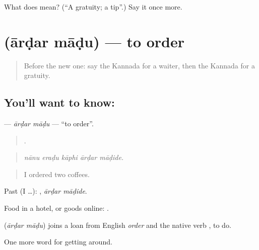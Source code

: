 \begin{tcolorbox}[breakable,colback=teal!4,colframe=teal!35!black,title={Before you move on}]
What does  mean? (\textquotedblleft{}A gratuity; a tip\textquotedblright{}.) Say it once more.
\end{tcolorbox}
\section[\texorpdfstring{\kn{ಆರ್ಡರ್} \kn{ಮಾಡು} (ārḍar māḍu)}{ಆರ್ಡರ್ ಮಾಡು (ārḍar māḍu)}]{  (ārḍar māḍu) — to order}

\label{lesson:KA-C464-ardar-madu}



\begin{quote}
Before the new one: say the Kannada for a waiter, then the Kannada for a gratuity.
\end{quote}

\subsection*{You'll want to know:  }
\textbf{ } — \emph{ārḍar māḍu} — \textquotedblleft{}to order\textquotedblright{}.

\begin{quote}
    .
\end{quote}

\begin{quote}
\emph{nānu eraḍu kāphi ārḍar māḍide.}
\end{quote}

\begin{quote}
I ordered two coffees.
\end{quote}

Past (I …):  , \emph{ārḍar māḍide}.

Food in a hotel, or goods online:   .

\begin{cousinweb}
\textbf{ } (\emph{ārḍar māḍu}) joins a loan from English \emph{order} and the native verb , to do.
\end{cousinweb}

\begin{grammarlens}[title={What you've built}]
One more word for getting around.
\end{grammarlens}

